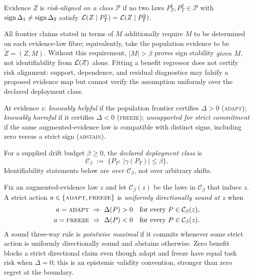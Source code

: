 \begin{definition}\label{def:risk-align}
Evidence $Z$ is \emph{risk-aligned on a class $\mathcal{P}$} if no two laws
$P_T^1,P_T^2\in\mathcal{P}$ with $\operatorname{sign}\Delta_1\neq\operatorname{sign}\Delta_2$ satisfy
$\mathcal{L}(Z\mid P_T^1)=\mathcal{L}(Z\mid P_T^2)$.
\end{definition}
All frontier claims stated in terms of $M$ additionally require $M$ to be determined on each
evidence-law fibre; equivalently, take the population evidence to be $\widetilde Z=(Z,M)$. Without
this requirement, $|M|>\beta$ proves sign stability \emph{given $M$}, not identifiability from
$\mathcal{L}(Z)$ alone. Fitting a benefit regressor does not certify risk alignment: support, dependence,
and residual diagnostics may falsify a proposed evidence map but cannot verify the assumption
uniformly over the declared deployment class.

\begin{definition}[Regimes]\label{def:regimes}
At evidence $z$: \emph{knowably helpful} if the population frontier certifies $\Delta>0$
(\textsc{adapt}); \emph{knowably harmful} if it certifies $\Delta<0$ (\textsc{freeze});
\emph{unsupported for strict commitment} if the same augmented-evidence law is compatible with
distinct signs, including zero versus a strict sign (\textsc{abstain}).
\end{definition}

For a supplied drift budget $\beta\ge0$, the \emph{declared deployment class} is
\[
\mathcal{C}_\beta \;:=\; \bigl\{P_T:\ |\gamma(P_T)|\le\beta\bigr\}.
\]
Identifiability statements below are \emph{over $\mathcal{C}_\beta$}, not over arbitrary shifts.

\begin{definition}\label{def:strict-sound}
Fix an augmented-evidence law $z$ and let $\mathcal C_\beta(z)$ be the laws in
$\mathcal C_\beta$ that induce $z$. A strict action $a\in\{\textsc{adapt},\textsc{freeze}\}$
is \emph{uniformly directionally sound at $z$} when
\[
\begin{aligned}
a=\textsc{adapt}&\ \Rightarrow\ \Delta(P)>0
&&\text{for every }P\in\mathcal C_\beta(z),\\
a=\textsc{freeze}&\ \Rightarrow\ \Delta(P)<0
&&\text{for every }P\in\mathcal C_\beta(z).
\end{aligned}
\]
A sound three-way rule is \emph{pointwise maximal} if it commits whenever some strict action is
uniformly directionally sound and abstains otherwise. Zero benefit blocks a strict directional
claim even though adapt and freeze have equal task risk when $\Delta=0$; this is an epistemic
validity convention, stronger than zero regret at the boundary.
\end{definition}

